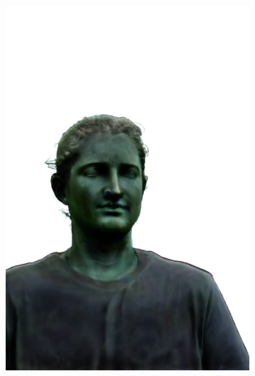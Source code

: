 \begin{figure}[ht]
\begin{subfigure}{0.08\linewidth}
        \includegraphics[width=\textwidth]{Figures/results/high/ephra_stone/11_render.png}

\end{subfigure}
\end{figure}
